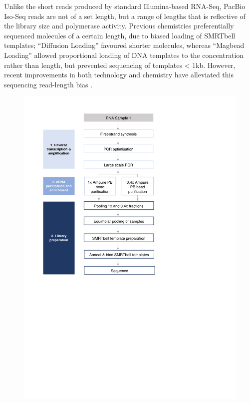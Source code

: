 Unlike the short reads produced by standard Illumina-based RNA-Seq, PacBio Iso-Seq reads are not of a set length, but a range of lengths that is reflective of the library size and polymerase activity\cite{Ardui2018,Rhoads2015}. Previous chemistries preferentially sequenced molecules of a certain length, due to biased loading of SMRTbell templates; “Diffusion Loading” favoured shorter molecules\cite{Loomis2013}, whereas “Magbead Loading” allowed proportional loading of DNA templates to the concentration rather than length, but prevented sequencing of templates < 1kb. However, recent improvements in both technology and chemistry have alleviated this sequencing read-length bias \cite{Oikonomopoulos2020}.

\begin{figure}[!h]
	\centering
	\includegraphics[page=14,trim={0 5cm 0 0 },clip, scale = 0.7]{Figures/ProjectDevelopment_Figures.pdf}

\end{figure}
